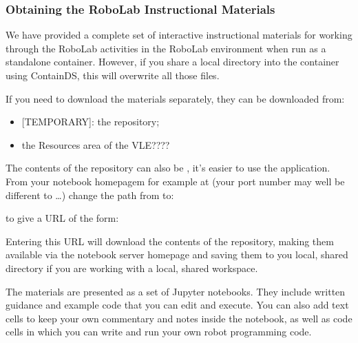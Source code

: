 \documentclass[letterpaper,10pt,english]{sphinxmanual}
\begin{document}
\subsubsection{Obtaining the RoboLab Instructional Materials}
\label{\detokenize{content/00_READ_ME_FIRST/Section_00_05_Accessing_RoboLab:Obtaining-the-RoboLab-Instructional-Materials}}
We have provided a complete set of interactive instructional materials for working through the RoboLab activities in the RoboLab environment when run as a standalone container. However, if you share a local directory into the container using ContainDS, this will overwrite all those files.

If you need to download the materials separately, they can be downloaded from:
\begin{itemize}
\item {} 
{[}TEMPORARY{]}: the  repository;

\item {} 
the Resources area of the VLE???? 

\end{itemize}

The contents of the repository can also be , it’s easier to use the  application. From your notebook homepagem for example at  (your port number may well be different to …) change the path from  to:


to give a URL of the form:


Entering this URL will download the contents of the repository, making them available via the notebook server homepage and saving them to you local, shared directory if you are working with a local, shared workspace.

The materials are presented as a set of Jupyter notebooks. They include written guidance and example code that you can edit and execute. You can also add text cells to keep your own commentary and notes inside the notebook, as well as code cells in which you can write and run your own robot programming code.
\end{document}
